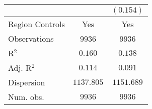 \begin{center}
\begin{tiny}
\begin{longtable}{l@{} c@{} c@{}}
                                                                                           &                  & $(0.154)$      \\
\hline
Region Controls                                                                            & Yes              & Yes            \\
Observations                                                                               & 9936             & 9936           \\
R$^2$                                                                                      & $0.160$          & $0.138$        \\
Adj. R$^2$                                                                                 & $0.114$          & $0.091$        \\
Dispersion                                                                                 & $1137.805$       & $1151.689$     \\
Num. obs.                                                                                  & $9936$           & $9936$         \\
\end{longtable}
\end{tiny}
\end{center}
